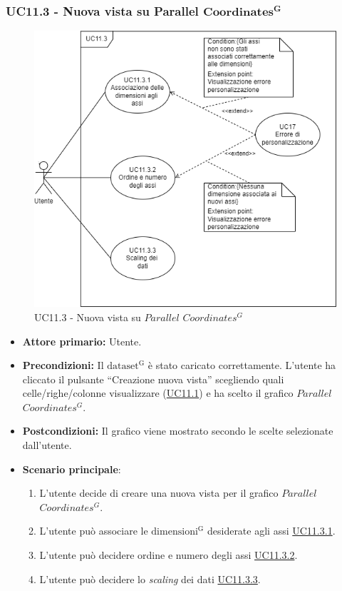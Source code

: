 \subsubsection{UC11.3 - Nuova vista su Parallel ${\mathbf{Coordinates^{G}}}$}
\label{sec:UC11.3}
\begin{figure}[h!]
	\centering
	\includegraphics[scale=0.60]{../../assets/creazionevista_parallel_coordinates.png}
	\caption{UC11.3 - Nuova vista su $Parallel$ $Coordinates^{G}$}
\end{figure}
\begin{itemize}
    \item \textbf{Attore primario:} Utente.
    \item \textbf{Precondizioni:} Il ${\mathrm{dataset^{G}}}$ è stato caricato correttamente. L'utente ha cliccato il pulsante ``Creazione nuova vista'' scegliendo quali celle/righe/colonne visualizzare (\hyperref[sec:UC11.1]{UC11.1}) e ha scelto il grafico $Parallel$ $Coordinates^{G}$.
    \item \textbf{Postcondizioni:} Il grafico viene mostrato secondo le scelte selezionate dall'utente.
    \item \textbf{Scenario principale}:
    \begin{enumerate}
		\item L'utente decide di creare una nuova vista per il grafico $Parallel$ $Coordinates^{G}$.
		\item L'utente può associare le ${\mathrm{dimensioni^{G}}}$ desiderate agli assi \hyperref[sec:UC11.3.1]{UC11.3.1}.
		\item L'utente può decidere ordine e numero degli assi \hyperref[sec:UC11.3.2]{UC11.3.2}.
		\item L'utente può decidere lo \textit{scaling} dei dati \hyperref[sec:UC11.3.3]{UC11.3.3}.
	\end{enumerate}
\end{itemize}

